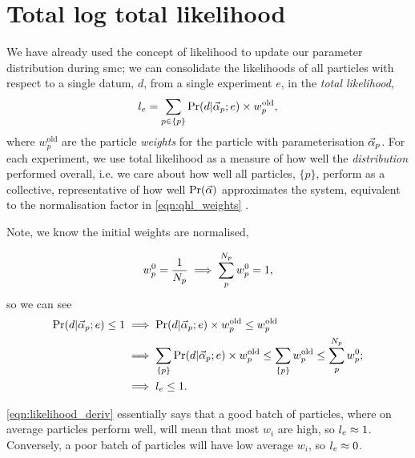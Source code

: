 \section{Total log total likelihood}\label{sec:total_log_total_likelihood}
We have already used the concept of  \gls{likelihood} to update our parameter distribution during \gls{smc}; 
we can consolidate the \glspl{likelihood}  of all \glspl{particle} with respect to a single datum, $d$, from a single \gls{experiment} $e$,  
in the \emph{\gls{total likelihood}}, 
\begin{equation}
    \label{eqn:total_likelihood}
    l_{e} = \sum\limits_{p \in \{p\}} \Pr(d | \vec{\alpha}_p ; e) \times w_p^{\textrm{old}},
\end{equation}
where $w_p^{\textrm{old}}$ are the \gls{particle} \emph{weights} for the \gls{particle} with parameterisation $\vec{\alpha}_p$.
For each experiment, we use \gls{total likelihood} as a measure of how well the \emph{distribution} performed overall,
i.e. we care about how well all \glspl{particle}, $\{p\}$, perform as a collective, representative of how well $\Pr(\vec{\alpha})$ approximates the system,
equivalent to the normalisation factor in \cref{eqn:qhl_weights} \cite{granade2015characterizationp92}. 
\par 
Note, we know the initial weights are normalised,

\begin{equation}
w_p^0 = \frac{1}{N_p}  \implies \sum_p^{N_p} w_p^0 = 1,
\label{eqn:normalised_weights}
\end{equation}
so we can see 
\begin{align}    
\label{eqn:likelihood_deriv}
\begin{split}
    \Pr(d | \vec{\alpha}_p; e) \leq 1 & \implies \Pr(d | \vec{\alpha}_p; e) \times w_p^{\textrm{old}} \leq w_p^{\textrm{old}} \\
    & \implies \sum\limits_{\{p\}} \Pr(d | \vec{\alpha}_p; e) \times w_p^{\textrm{old}} \leq \sum\limits_{\{p\}} w_p^{\textrm{old}} \leq \sum_p^{N_p} w_p^0; \\
    & \implies l_{e} \leq 1.
\end{split}
\end{align}

\cref{eqn:likelihood_deriv} essentially says that a good batch of \glspl{particle}, 
where on average \glspl{particle} perform well, 
will mean that most $w_i$ are high, so $l_{e} \approx 1$. 
Conversely, a poor batch of \glspl{particle} will have low average $w_i$, so $l_{e} \approx 0$. 
\par

